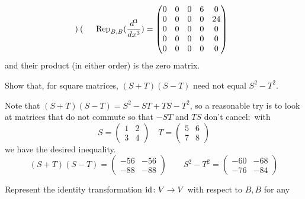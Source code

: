 \begin{exercises}
\begin{answer}
\begin{exparts}
\begin{equation*}
\begin{pmatrix}
            \end{pmatrix}
            \qquad
            \rep{\frac{d^3}{dx^3}}{B,B}=\begin{pmatrix}
              0  &0  &0  &6  &0  \\
              0  &0  &0  &0  &24 \\
              0  &0  &0  &0  &0  \\
              0  &0  &0  &0  &0  \\
              0  &0  &0  &0  &0
            \end{pmatrix}
          \end{equation*}
          and their product (in either order) is the zero matrix.
      \end{exparts}  
    \end{answer}
  \item 
    Show that, for square matrices, \( (S+T)(S-T) \) need not equal
    \( S^2-T^2 \).
    \begin{answer}
      Note that \( (S+T)(S-T)=S^2-ST+TS-T^2 \), so a reasonable try is to look
      at matrices that do not commute so that $-ST$ and $TS$ don't 
      cancel:~with 
      \begin{equation*}
        S=\begin{pmatrix}
            1  &2  \\
            3  &4
          \end{pmatrix}
        \quad
        T=\begin{pmatrix}
            5  &6  \\
            7  &8
          \end{pmatrix}
      \end{equation*}
      we have the desired inequality.
      \begin{equation*}
        (S+T)(S-T)=\begin{pmatrix}
            -56  &-56  \\
            -88  &-88
          \end{pmatrix}
        \qquad
        S^2-T^2=\begin{pmatrix}
            -60  &-68  \\
            -76  &-84
          \end{pmatrix}
      \end{equation*}    
    \end{answer}
  \recommended \item \label{exer:IdMat} 
    Represent the identity transformation 
    $\map{\identity}{V}{V}$ with respect to $B,B$ for any

\end{exercises}
